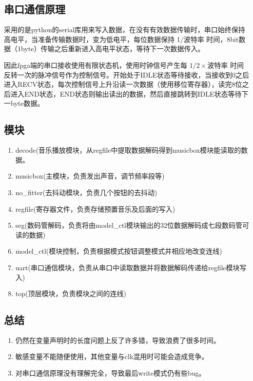 \documentclass{ctexart}
\begin{document}
	\subsection{串口通信原理}
	采用的是python的serial库用来写入数据，在没有有效数据传输时，串口始终保持高电平，当准备传输数据时，变为低电平，每位数据保持 1/波特率 时间，8bit数据（1byte）传输之后重新进入高电平状态，等待下一次数据传入。

	因此fpga端的串口接收使用有限状态机，使用时钟信号产生每 $1/2\times$波特率 时间反转一次的脉冲信号作为控制信号。开始处于IDLE状态等待接收，当接收到0之后进入RECV状态，每次控制信号上升沿读一次数据（使用移位寄存器），读完8位之后进入END状态，END状态则输出读出的数据，然后直接跳转到IDLE状态等待下一byte数据。
	\subsection{模块}
	\begin{enumerate}
		\item decode(音乐播放模块，从regfile中提取数据解码得到musicbox模块能读取的数据。
		\item musicbox(主模块，负责发出声音，调节频率段等)
		\item no\_fitter(去抖动模块，负责几个按钮的去抖动)
		\item regfile(寄存器文件，负责存储预置音乐及后面的写入)
		\item seg(数码管解码，负责将由model\_ctl模块输出的32位数据解码成七段数码管可读的数据)
		\item model\_ctl(模块控制，负责根据模式按钮调整模式并相应地改变连线)
		\item uart(串口通信模块，负责从串口中读取数据并将数据解码传递给regfile模块写入)
		\item top(顶层模块，负责模块之间的连线)
	\end{enumerate}
	\subsection{总结}
	\begin{enumerate}
		\item 仍然在变量声明时的长度问题上反了许多错，导致浪费了很多时间。
		\item 敏感变量不能随便使用，其他变量与clk混用时可能会造成竞争。
		\item 对串口通信原理没有理解完全，导致最后write模式仍有些bug。
	\end{enumerate}
		
\end{document}
